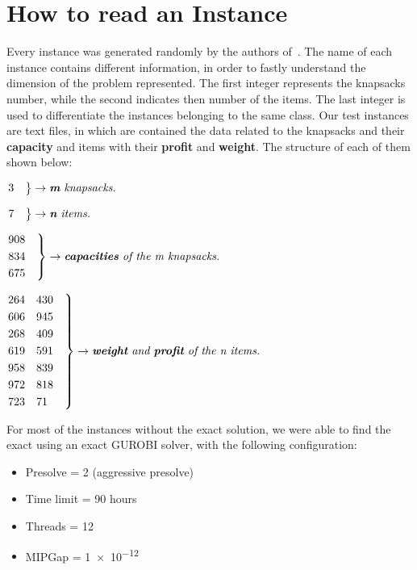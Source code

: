 \section{How to read an Instance}
Every instance was generated randomly by the authors of~\cite{mkp:2019}.
The name of each instance contains different information, in order to fastly understand the dimension of the problem represented.
The first integer represents the knapsacks number, while the second indicates then number of the items.
The last integer is used to differentiate the instances belonging to the same class.
Our test instances are text files, in which are contained the data related to the knapsacks and their \textbf{capacity} and items with their \textbf{profit} and \textbf{weight}. The structure of each of them shown below:

	\begin{flushleft} 
		$\begin{rcases*}
			3 \quad
		\end{rcases*} \rightarrow \textit{\textbf{m} knapsacks.}$
	\end{flushleft}
	\begin{flushleft}
		$\begin{rcases*}
			7 \quad
		\end{rcases*} \rightarrow \textit{\textbf{n} items.}$
	\end{flushleft}

	\begin{flushleft}
		$\begin{rcases*}
			908 \quad
			\\834 
			\\675 
		\end{rcases*} \rightarrow \textit{\textbf{capacities} of the m knapsacks.}$
	\end{flushleft}
	\begin{flushleft}
		$\begin{rcases*}
			264	\quad 430 \quad
			\\606 \quad	945
			\\268 \quad	409
			\\619 \quad	591
			\\958 \quad	839
			\\972 \quad	818
			\\723 \quad	71
		\end{rcases*} \rightarrow \textit{\textbf{weight} and \textbf{profit} of the n items.}$
	\end{flushleft}

For most of the instances without the exact solution, we were able to
find the exact using an exact GUROBI solver, with the following configuration:
\newpage
\begin{itemize}
    \item Presolve = 2 (aggressive presolve)
    \item Time limit = 90 hours
    \item Threads = 12
    \item MIPGap = \num{1e-12}
\end{itemize}

